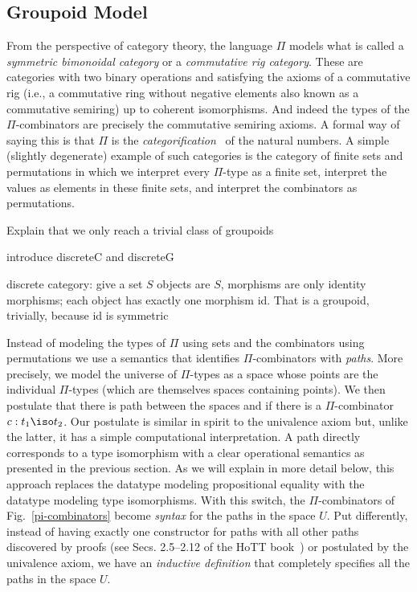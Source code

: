 \subsection{Groupoid Model} 

From the perspective of category theory, the language $\Pi$ models what is
called a \emph{symmetric bimonoidal category} or a \emph{commutative rig
category}. These are categories with two binary operations and satisfying the
axioms of a commutative rig (i.e., a commutative ring without negative
elements also known as a commutative semiring) up to coherent
isomorphisms. And indeed the types of the $\Pi$-combinators are precisely the
commutative semiring axioms. A formal way of saying this is that $\Pi$ is the
\emph{categorification}~\cite{math/9802029} of the natural numbers. A simple
(slightly degenerate) example of such categories is the category of finite
sets and permutations in which we interpret every $\Pi$-type as a finite set,
interpret the values as elements in these finite sets, and interpret the
combinators as permutations. 

Explain that we only reach a trivial class of groupoids

introduce discreteC and discreteG

discrete category: give a set $S$ objects are $S$, morphisms are only
identity morphisms; each object has exactly one morphism id. That is a
groupoid, trivially, because id is symmetric

Instead of modeling the types of $\Pi$ using sets and the combinators using
permutations we use a semantics that identifies $\Pi$-combinators with
\emph{paths}. More precisely, we model the universe of $\Pi$-types as a space
 whose points are the individual $\Pi$-types (which are
themselves spaces  containing points). We then postulate that
there is path between the spaces  and  if there
is a $\Pi$-combinator $c : t_1 \iso t_2$. Our postulate is similar in spirit
to the univalence axiom but, unlike the latter, it has a simple computational
interpretation. A path directly corresponds to a type isomorphism with a
clear operational semantics as presented in the previous section. As we will
explain in more detail below, this approach replaces the datatype
 modeling propositional equality with the datatype
 modeling type isomorphisms. With this switch, the
$\Pi$-combinators of Fig.~\ref{pi-combinators} become \emph{syntax} for the
paths in the space $U$. Put differently, instead of having exactly one
constructor  for paths with all other paths
discovered by proofs (see Secs. 2.5--2.12 of the HoTT
book~\citeyearpar{hottbook}) or postulated by the univalence axiom, we have
an \emph{inductive definition} that completely specifies all the paths in the
space $U$.


